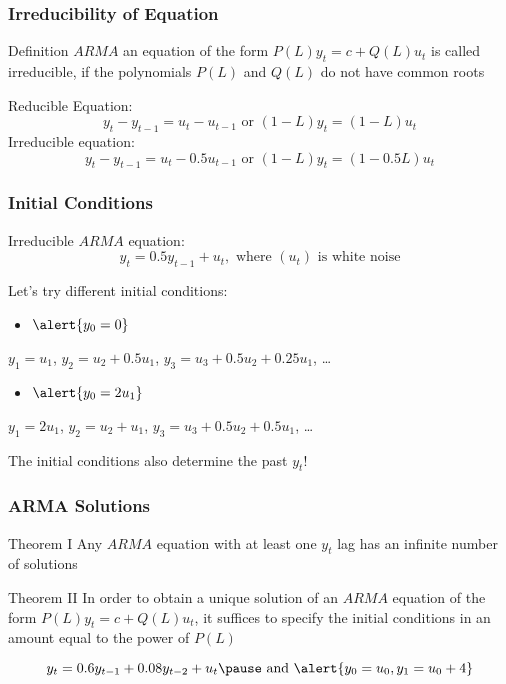 \begin{frame}
	\frametitle{Irreducibility of Equation}
	
	\begin{block}{Definition}
		$ARMA$ an equation of the form $P(L) y_t = c + Q(L) u_t$ is called \alert{irreducible},
		if the polynomials $P(L)$ and $Q(L)$ do not have common roots
	\end{block}
	
	\pause
	Reducible Equation:
	\[
	y_t - y_{t-1} = u_t - u_{t-1} \text{ or } (1- L)y_t = (1 - L)u_t
	\]
	\pause
	Irreducible equation:
	\[
	y_t - y_{t-1} = u_t - 0.5u_{t-1} \text{ or } (1- L)y_t = (1 - 0.5L)u_t
	\]
	
\end{frame}





\begin{frame}
	\frametitle{Initial Conditions}
	Irreducible $ARMA$ equation:
	\[
	y_t = 0.5 y_{t-1} + u_t, \text{ where } (u_t) \text{ is white noise}
	\]
	
	\pause
	Let's try different initial conditions:
	\pause
	\begin{itemize}
		\item $\alert{y_0=0}$
	\end{itemize}
	\pause
	$y_1 = u_1$, $y_2 = u_2 + 0.5 u_1$, $y_3 = u_3 + 0.5 u_2 + 0.25 u_1$, \ldots
	\pause \pause
	\begin{itemize}
		\item $\alert{y_0=2u_1}$
	\end{itemize}
	\pause
	$y_1 = 2u_1$, $y_2 = u_2 + u_1$, $y_3 = u_3 + 0.5 u_2 + 0.5 u_1$, \ldots
	\pause
	
	The initial conditions also determine the past $y_t$!
	
\end{frame}

\begin{frame}
	\frametitle{ARMA Solutions}
	
	\begin{block}{Theorem I}
		Any $ARMA$ equation with at least one $y_t$ lag has an infinite number of solutions
	\end{block}
	
	\pause
	\begin{block}{Theorem II}
		In order to obtain a unique solution of an $ARMA$  equation of the form $P(L)y_t = c + Q(L) u_t$,
		it suffices to specify the initial conditions in an amount equal to the power of $P(L)$
	\end{block}
	\pause
	\[
	y_t = 0.6 y_{t-1} + 0.08y_{t-2} + u_t \pause \text{ and } \alert{y_0 = u_0, y_1 = u_0 + 4}
	\]
	
\end{frame}

